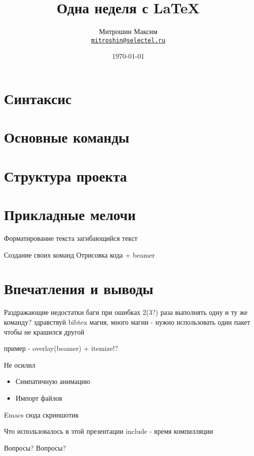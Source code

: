 \documentclass[10pt]{beamer}
\title{Одна неделя с \LaTeX}
\author[Митрошин Максим]{Митрошин Максим \\ \texttt{\href{mailto:mitroshin@selectel.ru}{mitroshin@selectel.ru}}}
\date{\today}
\institute{Selectel}
\begin{document}
\begin{frame}
\titlepage
\end{frame}

\section{Синтаксис}


\section{Основные команды}


\section{Структура проекта}


\section{Прикладные мелочи}



\begin{frame}[fragile]{Форматирование текста}
  загибающийся текст
\end{frame}

\begin{frame}[fragile]{Создание своих команд}
  Отрисовка кода + beamer
\end{frame}

\section{Впечатления и выводы}

\begin{frame}{Раздражающие недостатки}
  баги при ошибках
  2(3?) раза выполнять одну и ту же команду? здравствуй bibtex 
  магия, много магии - нужно использовать один пакет чтобы не крашился другой 
  
  пример - overlay(beamer) + itemize!?
  
\end{frame}

\begin{frame}{Не осилил}
  \begin{itemize}
    \item Симпатичную анимацию
    \item Импорт файлов
  \end{itemize}  
\end{frame}

\begin{frame}{Emacs}
  сюда скриншотик
\end{frame}

\begin{frame}{Что использовалось в этой презентации}
  include - время компилляции  
\end{frame}

\begin{frame}{Вопросы?}
  Вопросы?
\end{frame}
\end{document}
